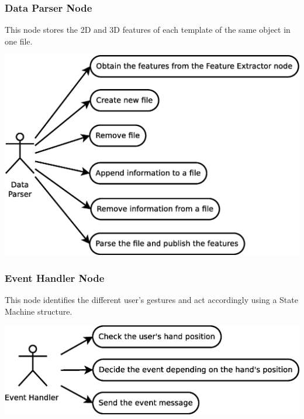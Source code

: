 \documentclass{article}
\begin{document}
\subsubsection{Data Parser Node}
This node stores the 2D and 3D features of each template of the same object in one file. 
\begin{center}
	\includegraphics[scale=0.4]{img/diagrams/uc_data_parser.eps}
\end{center}


\subsubsection{Event Handler Node}
	This node identifies the different user's gestures and act accordingly using a State Machine structure. 
	\begin{center}
		\includegraphics[scale=0.4]{img/diagrams/uc_event_handler.eps}
	\end{center}
	
\end{document}
